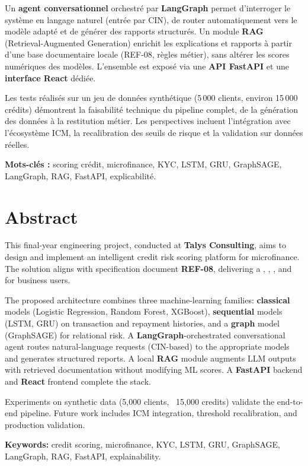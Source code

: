 Un \textbf{agent conversationnel} orchestré par \textbf{LangGraph} permet d'interroger le système en langage naturel (entrée par CIN), de router automatiquement vers le modèle adapté et de générer des rapports structurés. Un module \textbf{RAG} (Retrieval-Augmented Generation) enrichit les explications et rapports à partir d'une base documentaire locale (REF-08, règles métier), sans altérer les scores numériques des modèles. L'ensemble est exposé via une \textbf{API FastAPI} et une \textbf{interface React} dédiée.

Les tests réalisés sur un jeu de données synthétique (5\,000 clients, environ 15\,000 crédits) démontrent la faisabilité technique du pipeline complet, de la génération des données à la restitution métier. Les perspectives incluent l'intégration avec l'écosystème ICM, la recalibration des seuils de risque et la validation sur données réelles.

\textbf{Mots-clés :} scoring crédit, microfinance, KYC, LSTM, GRU, GraphSAGE, LangGraph, RAG, FastAPI, explicabilité.

\chapter*{Abstract}

This final-year engineering project, conducted at \textbf{Talys Consulting}, aims to design and implement an intelligent credit risk scoring platform for microfinance. The solution aligns with specification document \textbf{REF-08}, delivering a , , , and  for business users.

The proposed architecture combines three machine-learning families: \textbf{classical} models (Logistic Regression, Random Forest, XGBoost), \textbf{sequential} models (LSTM, GRU) on transaction and repayment histories, and a \textbf{graph} model (GraphSAGE) for relational risk. A \textbf{LangGraph}-orchestrated conversational agent routes natural-language requests (CIN-based) to the appropriate models and generates structured reports. A local \textbf{RAG} module augments LLM outputs with retrieved documentation without modifying ML scores. A \textbf{FastAPI} backend and \textbf{React} frontend complete the stack.

Experiments on synthetic data (5,000 clients, ~15,000 credits) validate the end-to-end pipeline. Future work includes ICM integration, threshold recalibration, and production validation.

\textbf{Keywords:} credit scoring, microfinance, KYC, LSTM, GRU, GraphSAGE, LangGraph, RAG, FastAPI, explainability.

\tableofcontents
\listoffigures
\listoftables
\cleardoublepage
{}
\setcounter{page}{1}
